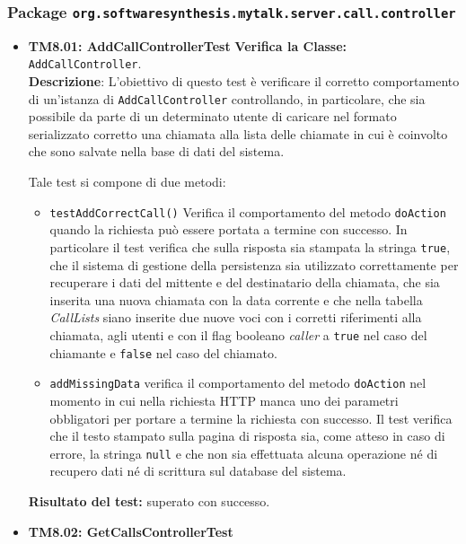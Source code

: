 \subsubsection{Package \texttt{org.softwaresynthesis.mytalk.server.call.controller}}
\begin{itemize}


\item[\passed] \textbf{TM8.01: AddCallControllerTest} 
\textbf{Verifica la Classe:} \texttt{AddCallController}.\\
\textbf{Descrizione}: L'obiettivo di questo test è verificare il corretto comportamento di un'istanza di \texttt{AddCallController} controllando, in particolare, che sia possibile da parte di un determinato utente di caricare nel formato serializzato corretto una chiamata alla lista delle chiamate in cui è coinvolto che sono salvate nella base di dati del sistema.

Tale test si compone di due metodi:
\begin{itemize}
\item \texttt{testAddCorrectCall()} Verifica il comportamento del metodo \texttt{doAction} quando la richiesta può essere portata a termine con successo. In particolare il test verifica che sulla risposta sia stampata la stringa \texttt{true}, che il sistema di gestione della persistenza sia utilizzato correttamente per recuperare i dati del mittente e del destinatario della chiamata, che sia inserita una nuova chiamata con la data corrente e che nella tabella \textit{CallLists} siano inserite due nuove voci con i corretti riferimenti alla chiamata, agli utenti e con il flag booleano \textit{caller} a \texttt{true} nel caso del chiamante e \texttt{false} nel caso del chiamato.

\item \texttt{addMissingData} verifica il comportamento del metodo \texttt{doAction} nel momento in cui nella richiesta HTTP manca uno dei parametri obbligatori per portare a termine la richiesta con successo. Il test verifica che il testo stampato sulla pagina di risposta sia, come atteso in caso di errore, la stringa \texttt{null} e che non sia effettuata alcuna operazione né di recupero dati né di scrittura sul database del sistema.

\end{itemize}
\textbf{Risultato del test:} superato con successo.

\item[\passed] \textbf{TM8.02: GetCallsControllerTest} 


\end{itemize}
